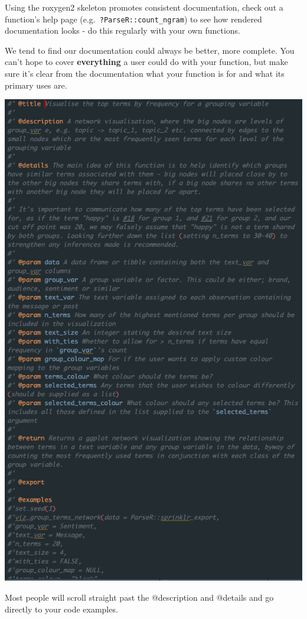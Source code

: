 \documentclass[
  letterpaper,
  DIV=11,
  numbers=noendperiod]{scrreprt}
\begin{document}
Using the roxygen2 skeleton promotes consistent documentation, check out
a function's help page (e.g.~\texttt{?ParseR::count\_ngram}) to see how
rendered documentation looks - do this regularly with your own
functions.

We tend to find our documentation could always be better, more complete.
You can't hope to cover \textbf{everything} a user could do with your
function, but make sure it's clear from the documentation what your
function is for and what its primary uses are.

\includegraphics{img/parser_documentation.png}

\begin{tcolorbox}[enhanced jigsaw, colback=white, opacitybacktitle=0.6, coltitle=black, left=2mm, breakable, bottomtitle=1mm, toptitle=1mm, toprule=.15mm, colframe=quarto-callout-warning-color-frame, titlerule=0mm, title=\textcolor{quarto-callout-warning-color}{\faExclamationTriangle}\hspace{0.5em}{Warning}, colbacktitle=quarto-callout-warning-color!10!white, rightrule=.15mm, bottomrule=.15mm, arc=.35mm, opacityback=0, leftrule=.75mm]

Most people will scroll straight past the @description and @details and
go directly to your code examples.

\end{tcolorbox}
\end{document}
